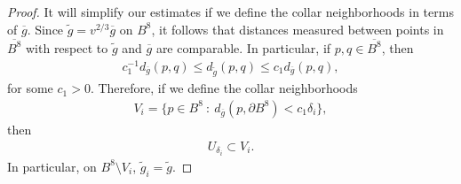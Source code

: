 \documentclass{amsart}
\newcommand{\wti}{\widetilde{g}_i}
\theoremstyle{definition}
\theoremstyle{remark}
\numberwithin{equation}{section}
\begin{document}
\begin{proof}
It will simplify our estimates if we define the collar neighborhoods in terms of $\overline{g}$.  Since $\widetilde{g} = v^{2/3}\overline{g}$ on $B^8$, it follows that distances measured between points in $\overline{B^8}$ with respect to $\widetilde{g}$ and $\overline{g}$ are comparable.  In particular, if $p,q \in \overline{B^8}$, then
\begin{align*} %
c_1^{-1} d_{\overline{g}}(p,q) \leq d_{\widetilde{g}}(p,q) \leq c_1 d_{\overline{g}}(p,q),
\end{align*}
for some $c_1 > 0$.  Therefore, if we define the collar neighborhoods
\begin{align*} %
V_i = \{ p \in B^8\ :\ d_{\overline{g}}(p,\partial B^8) < c_1 \delta_i \},
\end{align*}
then
\begin{align*}  %
U_{\delta_i} \subset V_i.
\end{align*}
In particular, on $B^8 \setminus V_i$, $\wti = \widetilde{g}$.


\end{proof}
\end{document}
